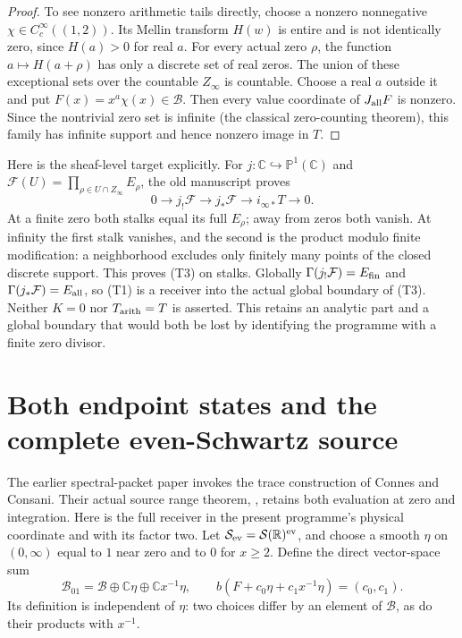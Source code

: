 \documentclass[11pt]{article}
\newcommand{\C}{\mathbb C}\newcommand{\R}{\mathbb R}
\newcommand{\B}{\mathscr B}\newcommand{\M}{\mathcal M}
\begin{document}
\begin{proof}
To see nonzero arithmetic tails directly, choose a nonzero nonnegative
$\chi\in C_c^\infty((1,2))$. Its Mellin transform $H(w)$ is entire
and is not identically zero, since $H(a)>0$ for real $a$.
For every actual zero $\rho$, the function $a\mapsto H(a+\rho)$
has only a discrete set of real zeros. The union of these exceptional
sets over the countable $Z_\infty$ is countable. Choose a real $a$
outside it and put $F(x)=x^a\chi(x)\in\B$.
Then every value coordinate of $J_{\rm all}F$ is nonzero. Since the
nontrivial zero set is infinite (the classical zero-counting theorem),
this family has infinite support and hence nonzero image in $T$.
\end{proof}

Here is the sheaf-level target explicitly. For $j:\C\hookrightarrow
\mathbb P^1(\C)$ and $\mathcal F(U)=\prod_{\rho\in U\cap Z_\infty}
E_\rho$, the old manuscript proves
\[
 0\to j_!\mathcal F\to j_*\mathcal F\to i_{\infty*}T\to0.\tag{T3}
\]
At a finite zero both stalks equal its full $E_\rho$; away from zeros
both vanish. At infinity the first stalk vanishes, and the second is
the product modulo finite modification: a neighborhood excludes only
finitely many points of the closed discrete support. This proves (T3)
on stalks. Globally $\Gamma(j_!\mathcal F)=E_{\rm fin}$ and
$\Gamma(j_*\mathcal F)=E_{\rm all}$, so (T1) is a receiver into the
actual global boundary of (T3). Neither $K=0$ nor $T_{\rm arith}=T$ is
asserted. This retains an analytic part and a global boundary that would
both be lost by identifying the programme with a finite zero divisor.

\section{Both endpoint states and the complete even-Schwartz source}
The earlier spectral-packet paper invokes the trace construction of Connes
and Consani. Their actual source range theorem, \cite[Lemma 4.1]{CCcycles},
retains both evaluation at zero and integration. Here is the full receiver
in the present programme's physical coordinate and with its factor two.
Let $\mathcal S_{\rm ev}=\mathcal S(\R)^{\rm ev}$, and choose a smooth
$\eta$ on $(0,\infty)$ equal to $1$ near zero and to $0$ for $x\geq2$.
Define the direct vector-space sum
\[
 \B_{01}=\B\oplus\C\eta\oplus\C x^{-1}\eta,
 \qquad b(F+c_0\eta+c_1x^{-1}\eta)=(c_0,c_1).
\]
Its definition is independent of $\eta$: two choices differ by an element
of $\B$, as do their products with $x^{-1}$.
\end{document}

